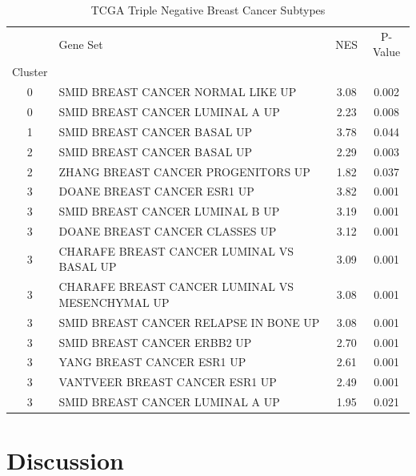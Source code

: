 \documentclass[fleqn,10pt]{wlscirep}
\begin{document}
\begin{table}
\begin{tabular}{clcc}
	\toprule
	{} &                                         Gene Set &   NES & P-Value \\
	Cluster &                                                  &       &         \\
	\midrule
	0       &                SMID BREAST CANCER NORMAL LIKE UP &  3.08 &   0.002 \\
	0       &                  SMID BREAST CANCER LUMINAL A UP &  2.23 &   0.008 \\
	1       &                      SMID BREAST CANCER BASAL UP &  3.78 &   0.044 \\
	2       &                      SMID BREAST CANCER BASAL UP &  2.29 &   0.003 \\
	2       &               ZHANG BREAST CANCER PROGENITORS UP &  1.82 &   0.037 \\
	3       &                      DOANE BREAST CANCER ESR1 UP &  3.82 &   0.001 \\
	3       &                  SMID BREAST CANCER LUMINAL B UP &  3.19 &   0.001 \\
	3       &                   DOANE BREAST CANCER CLASSES UP &  3.12 &   0.001 \\
	3       &        CHARAFE BREAST CANCER LUMINAL VS BASAL UP &  3.09 &   0.001 \\
	3       &  CHARAFE BREAST CANCER LUMINAL VS MESENCHYMAL UP &  3.08 &   0.001 \\
	3       &            SMID BREAST CANCER RELAPSE IN BONE UP &  3.08 &   0.001 \\
	3       &                      SMID BREAST CANCER ERBB2 UP &  2.70 &   0.001 \\
	3       &                       YANG BREAST CANCER ESR1 UP &  2.61 &   0.001 \\
	3       &                   VANTVEER BREAST CANCER ESR1 UP &  2.49 &   0.001 \\
	3       &                  SMID BREAST CANCER LUMINAL A UP &  1.95 &   0.021 \\
	\bottomrule
\end{tabular}
	\caption{TCGA Triple Negative Breast Cancer Subtypes}
	\label{stab:tnbc-table}
\end{table}

\section*{Discussion}
\end{document}
